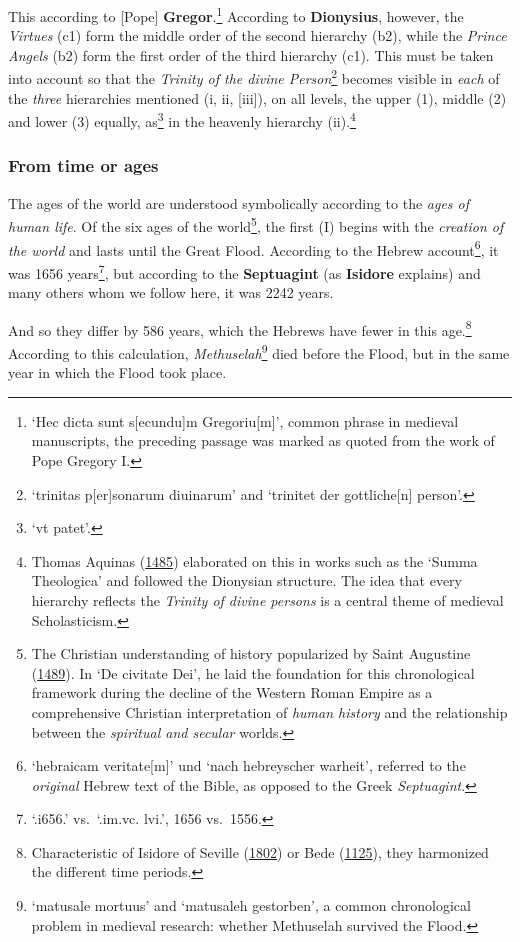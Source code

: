 \documentclass[
]{article}
\begin{document}
This according to {[}Pope{]} \textbf{Gregor}.\footnote{`Hec dicta sunt
  s{[}ecundu{]}m Gregoriu{[}m{]}', common phrase in medieval
  manuscripts, the preceding passage was marked as quoted from the work
  of Pope Gregory I.} According to \textbf{Dionysius}, however, the
\emph{Virtues} (c1) form the middle order of the second hierarchy (b2),
while the \emph{Prince Angels} (b2) form the first order of the third
hierarchy (c1). This must be taken into account so that the
\emph{Trinity of the divine Person}\footnote{`trinitas p{[}er{]}sonarum
  diuinarum' and `trinitet der gottliche{[}n{]} person'.} becomes
visible in \emph{each} of the \emph{three} hierarchies mentioned (i, ii,
{[}iii{]}), on all levels, the upper (1), middle (2) and lower (3)
equally, as\footnote{`vt patet'.} in the heavenly hierarchy
(ii).\footnote{Thomas Aquinas
  (\href{https://doi.org/10.3931/e-rara-15170}{1485}) elaborated on this
  in works such as the `Summa Theologica' and followed the Dionysian
  structure. The idea that every hierarchy reflects the \emph{Trinity of
  divine persons} is a central theme of medieval Scholasticism.}

\hypertarget{from-time-or-ages}{%
\subsubsection{From time or ages}\label{from-time-or-ages}}

The ages of the world are understood symbolically according to the
\emph{ages of human life}. Of the six ages of the world\footnote{The
  Christian understanding of history popularized by Saint Augustine
  (\href{https://doi.org/10.3931/e-rara-12425}{1489}). In `De civitate
  Dei', he laid the foundation for this chronological framework during
  the decline of the Western Roman Empire as a comprehensive Christian
  interpretation of \emph{human history} and the relationship between
  the \emph{spiritual and secular} worlds.}, the first (I) begins with
the \emph{creation of the world} and lasts until the Great Flood.
According to the Hebrew account\footnote{`hebraicam veritate{[}m{]}' und
  `nach hebreyscher warheit', referred to the \emph{original} Hebrew
  text of the Bible, as opposed to the Greek \emph{Septuagint}.}, it was
1656 years\footnote{`.i656.' vs.~`.im.vc. lvi.', 1656 vs.~1556.}, but
according to the \textbf{Septuagint} (as \textbf{Isidore} explains) and
many others whom we follow here, it was 2242 years.

And so they differ by 586 years, which the Hebrews have fewer in this
age.\footnote{Characteristic of Isidore of Seville
  (\href{https://books.google.com/books?id=wb8Z_vlSyJwC}{1802}) or Bede
  (\href{http://archivesetmanuscrits.bnf.fr/ark:/12148/cc76825p}{1125}),
  they harmonized the different time periods.} According to this
calculation, \emph{Methuselah}\footnote{`matusale mortuus' and
  `matusaleh gestorben', a common chronological problem in medieval
  research: whether Methuselah survived the Flood.} died before the
Flood, but in the same year in which the Flood took place.
\end{document}
